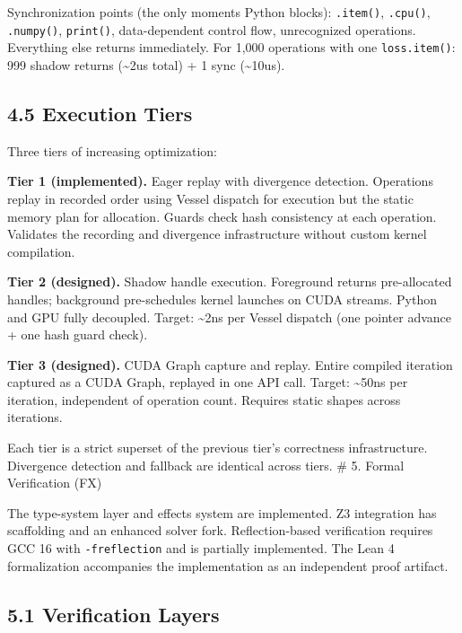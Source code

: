Synchronization points (the only moments Python blocks): \texttt{.item()}, \texttt{.cpu()}, \texttt{.numpy()}, \texttt{print()}, data-dependent control flow, unrecognized operations. Everything else returns immediately. For 1,000 operations with one \texttt{loss.item()}: 999 shadow returns (\textasciitilde2us total) + 1 sync (\textasciitilde10us).

\subsection{4.5 Execution Tiers}\label{execution-tiers}

Three tiers of increasing optimization:

\textbf{Tier 1 (implemented).} Eager replay with divergence detection. Operations replay in recorded order using Vessel dispatch for execution but the static memory plan for allocation. Guards check hash consistency at each operation. Validates the recording and divergence infrastructure without custom kernel compilation.

\textbf{Tier 2 (designed).} Shadow handle execution. Foreground returns pre-allocated handles; background pre-schedules kernel launches on CUDA streams. Python and GPU fully decoupled. Target: \textasciitilde2ns per Vessel dispatch (one pointer advance + one hash guard check).

\textbf{Tier 3 (designed).} CUDA Graph capture and replay. Entire compiled iteration captured as a CUDA Graph, replayed in one API call. Target: \textasciitilde50ns per iteration, independent of operation count. Requires static shapes across iterations.

Each tier is a strict superset of the previous tier's correctness infrastructure. Divergence detection and fallback are identical across tiers.
\# 5. Formal Verification (FX)

The type-system layer and effects system are implemented. Z3 integration has scaffolding and an enhanced solver fork. Reflection-based verification requires GCC 16 with \texttt{-freflection} and is partially implemented. The Lean 4 formalization accompanies the implementation as an independent proof artifact.

\subsection{5.1 Verification Layers}\label{verification-layers}

